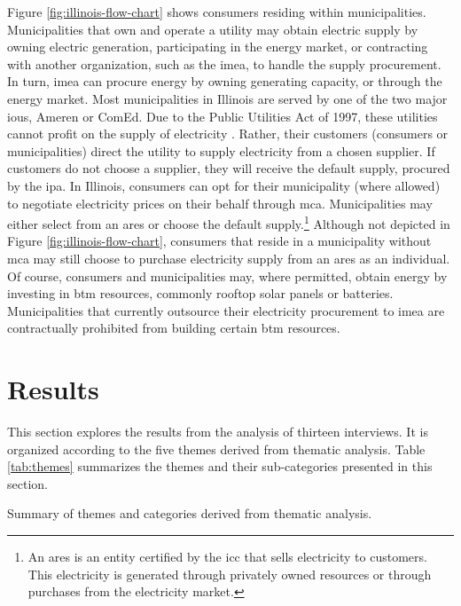 Figure \ref{fig:illinois-flow-chart} shows consumers residing within
municipalities. Municipalities that own and operate a utility may obtain
electric supply by owning electric generation, participating in the energy
market, or contracting with another organization, such as the \ac{imea}, to
handle the supply procurement. In turn, \ac{imea} can procure energy by owning
generating capacity, or through the energy market. Most municipalities in
Illinois are served by one of the two major \acp{iou}, Ameren or ComEd. Due to
the Public Utilities Act of 1997, these utilities cannot profit on the supply of
electricity \cite{illinois_90th_general_assembly_electric_1997}. Rather, their
customers (consumers or municipalities) direct the utility to supply electricity
from a chosen supplier. If customers do not choose a supplier, they will receive
the default supply, procured by the \ac{ipa}. In Illinois, consumers can opt for
their municipality (where allowed) to negotiate electricity prices on their
behalf through \ac{mca}. Municipalities may either select from an \ac{ares} or
choose the default supply.\footnote{An \ac{ares} is an entity certified by the
\ac{icc} that sells electricity to customers. This electricity is generated
through privately owned resources or through purchases from the electricity
market.} Although not depicted in Figure \ref{fig:illinois-flow-chart},
consumers that reside in a municipality without \ac{mca} may still choose to
purchase electricity supply from an \ac{ares} as an individual. Of course,
consumers and municipalities may, where permitted, obtain energy by investing in
\ac{btm} resources, commonly rooftop solar panels or batteries. Municipalities
that currently outsource their electricity procurement to \ac{imea} are
contractually prohibited from building certain \ac{btm} resources.

\section{Results}
This section explores the results from the analysis of thirteen interviews. It
is organized according to the five themes derived from thematic analysis. Table
\ref{tab:themes} summarizes the themes and their sub-categories presented in
this section.

\begin{table}[ht!]
    \centering
    \caption{Summary of themes and categories derived from thematic analysis.}
    \label{tab:themes}
    
\end{table}
\FloatBarrier

